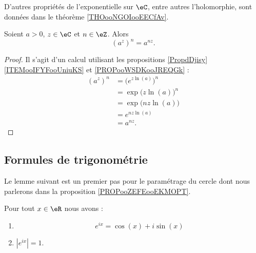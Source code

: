 D'autres propriétés de l'exponentielle sur \( \eC\), entre autres l'holomorphie, sont données dans le théorème \ref{THOooNGOIooEECfAv}.

\begin{lemma}        \label{LEMooTDGKooWdpUTD}
	Soient \( a>0\), \( z\in \eC\) et \( n\in \eZ\). Alors
	\begin{equation}
		(a^z)^n=a^{nz}.
	\end{equation}
\end{lemma}

\begin{proof}
	Il s'agit d'un calcul utilisant les propositions \ref{PropdDjisy}\ref{ITEMooIFYFooUniuKS} et \ref{PROPooWSDKooJREQGk} :
	\begin{subequations}
		\begin{align}
			(a^z)^n & =\big(  e^{z\ln(a)} \big)^n \\
			        & =\exp\big( z\ln(a) \big)^n  \\
			        & =\exp\big( nz\ln(a) \big)   \\
			        & = e^{nz\ln(a)}              \\
			        & =a^{nz}.
		\end{align}
	\end{subequations}
\end{proof}

\subsection{Formules de trigonométrie}

Le lemme suivant est un premier pas pour le paramétrage du cercle dont nous parlerons dans la proposition \ref{PROPooZEFEooEKMOPT}.
\begin{lemma}       \label{LEMooHOYZooKQTsXW}
	Pour tout \( x\in \eR\) nous avons :
	\begin{enumerate}
		\item
		      \begin{equation}        \label{EQooRVPJooTMwNTU}
			      e^{ix}=\cos(x)+i\sin(x)
		      \end{equation}
		\item
		      \( |  e^{ix} |=1\).
	\end{enumerate}
\end{lemma}

